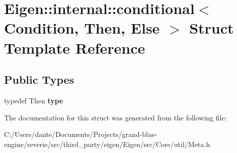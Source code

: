 \hypertarget{struct_eigen_1_1internal_1_1conditional}{}\section{Eigen\+::internal\+::conditional$<$ Condition, Then, Else $>$ Struct Template Reference}
\label{struct_eigen_1_1internal_1_1conditional}
\subsection*{Public Types}
\begin{DoxyCompactItemize}
\item 
\mbox{\label{struct_eigen_1_1internal_1_1conditional_a2433d8a903dfd8c2ea617c77a63b8f8a}} 
typedef Then {\bfseries type}
\end{DoxyCompactItemize}


The documentation for this struct was generated from the following file\+:\begin{DoxyCompactItemize}
\item 
C\+:/\+Users/dante/\+Documents/\+Projects/grand-\/blue-\/engine/reverie/src/third\+\_\+party/eigen/\+Eigen/src/\+Core/util/Meta.\+h\end{DoxyCompactItemize}
